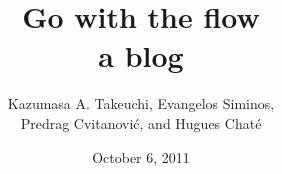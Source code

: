 \title{ 			Go with the flow
       \\ \Huge 	a blog
        \\\vspace{1.0cm}
        }\author{
		Kazumasa A. Takeuchi,
        Evangelos Siminos,
		\\
        Predrag Cvitanovi\'{c},
         and
        Hugues Chat\'e
        }

        \date{October 6, 2011} \Private{\date{\today}}
